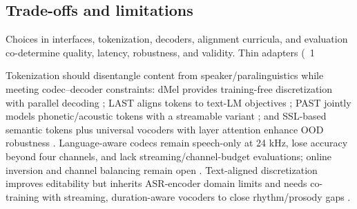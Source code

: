 \documentclass{article}
\begin{document}
\subsection{Trade-offs and limitations} \label{subsec:trade-offsandlimitations}

Choices in interfaces, tokenization, decoders, alignment curricula, and evaluation co-determine quality, latency, robustness, and validity. Thin adapters (~1%

Tokenization should disentangle content from speaker/paralinguistics while meeting codec--decoder constraints: dMel provides training-free discretization with parallel decoding \cite{bai2025dmelspeechtokenizationmadesimple}; LAST aligns tokens to text-LM objectives \cite{turetzky2024lastlanguagemodelawarespeechtokenization}; PAST jointly models phonetic/acoustic tokens with a streamable variant \cite{har-tuv2025pastphoneticacousticspeechtokenizer}; and SSL-based semantic tokens plus universal vocoders with layer attention enhance OOD robustness \cite{mousavi2024howshouldweextractdiscreteaudiotokenssel}. Language-aware codecs remain speech-only at 24 kHz, lose accuracy beyond four channels, and lack streaming/channel-budget evaluations; online inversion and channel balancing remain open \cite{ji2025languagecodecbridgingdiscreterepresentat}. Text-aligned discretization improves editability but inherits ASR-encoder domain limits and needs co-training with streaming, duration-aware vocoders to close rhythm/prosody gaps \cite{tsunoo2024decoderonlyarchitecturespeechrecognition}.
\end{document}
